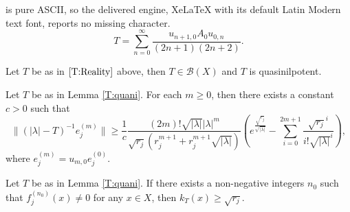 \documentclass[10pt,a4paper]{amsart}
\newcommand{\B}{{\mathcal{B}}}
\begin{document}
is pure ASCII, so the delivered engine, XeLaTeX with its default Latin Modern text font, reports no missing character.
\begin{equation}\label{T:Reality}
T=\sum\limits_{n=0}^{\infty}\frac{u_{n+1,0}  A_0 u_{0,n}}{(2n+1)(2n+2)}.
\end{equation}

\begin{lem}\label{T:quani}
Let $T$ be as in $\eqref{T:Reality}$ above, then $T\in\B(X)$ and $T$ is quasinilpotent.
\end{lem}

\begin{lem}\label{T:normvector}
Let $T$ be as in Lemma \ref{T:quani}.
For each $m\geq 0$, then there exists a constant $c>0$ such that
\begin{equation}\label{T:ej}
\|(|\lambda|-T)^{-1}e_j^{(m)}\|\geq
\frac{1}{c}\frac{(2m)!\sqrt{|\lambda|}|\lambda|^{m}}{\sqrt{r_j}(r_j^{m+1}+r_j^{m+1}\sqrt{|\lambda|})}
\left(e^{\frac{\sqrt{r_j}}{\sqrt{|\lambda|}}}-\sum_{i=0}^{2m+1}\frac{\sqrt{r_j}^i}{i!\sqrt{|\lambda|}^{i}}\right),
\end{equation}
where $e_j^{(m)}=u_{m,0}e_{j}^{(0)}$.
\end{lem}

\begin{prop}\label{T:subsetr}
Let $T$ be as in Lemma \ref{T:quani}.
If there exists a non-negative integers $n_0$ such that $f_{j}^{(n_0)}(x)\neq 0$ for any $x\in X$,
then $k_{T}(x)\geq \sqrt{r_j}$.
\end{prop}
\end{document}
